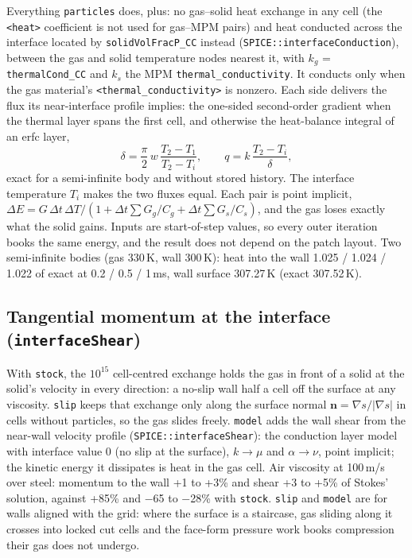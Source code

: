 \documentclass[11pt]{article}
\newcommand{\code}[1]{\texttt{\small #1}}
\newcommand{\dt}{\Delta t}
\begin{document}
Everything \code{particles} does, plus: no gas--solid heat exchange in any cell (the
\code{<heat>} coefficient is not used for gas--MPM pairs) and heat conducted across the
interface located by \code{solidVolFracP\_CC} instead (\code{SPICE::interfaceConduction}),
between the gas and solid temperature nodes nearest it, with $k_g$ = \code{thermalCond\_CC} and
$k_s$ the MPM \code{thermal\_conductivity}. It conducts only when the gas material's
\code{<thermal\_conductivity>} is nonzero. Each side delivers the flux its near-interface
profile implies: the one-sided second-order gradient when the thermal layer spans the first
cell, and otherwise the heat-balance integral of an erfc layer,
\begin{equation}
  \delta = \frac{\pi}{2}\,w\,\frac{T_2-T_1}{T_2-T_i},\qquad q = k\,\frac{T_2-T_i}{\delta},
\end{equation}
exact for a semi-infinite body and without stored history. The interface temperature $T_i$
makes the two fluxes equal. Each pair is point implicit,
$\Delta E = G\,\dt\,\Delta T/(1+\dt\sum G_g/C_g+\dt\sum G_s/C_s)$, and the gas loses exactly
what the solid gains. Inputs are start-of-step values, so every outer iteration books the same
energy, and the result does not depend on the patch layout. Two semi-infinite bodies (gas
330\,K, wall 300\,K): heat into the wall 1.025 / 1.024 / 1.022 of exact at 0.2 / 0.5 / 1\,ms,
wall surface 307.27\,K (exact 307.52\,K).

\subsection{Tangential momentum at the interface (\code{interfaceShear})}

With \code{stock}, the $10^{15}$ cell-centred exchange holds the gas in front of a solid at the
solid's velocity in every direction: a no-slip wall half a cell off the surface at any
viscosity. \code{slip} keeps that exchange only along the surface normal
$\mathbf n=\nabla s/|\nabla s|$ in cells without particles, so the gas slides freely.
\code{model} adds the wall shear from the near-wall velocity profile
(\code{SPICE::interfaceShear}): the conduction layer model with interface value 0 (no slip at
the surface), $k\to\mu$ and $\alpha\to\nu$, point implicit; the kinetic energy it dissipates is
heat in the gas cell. Air viscosity at 100\,m/s over steel: momentum to the wall +1 to +3\% and
shear +3 to +5\% of Stokes' solution, against +85\% and $-$65 to $-$28\% with \code{stock}.
\code{slip} and \code{model} are for walls aligned with the grid: where the surface is a
staircase, gas sliding along it crosses into locked cut cells and the face-form pressure work
books compression their gas does not undergo.
\end{document}

